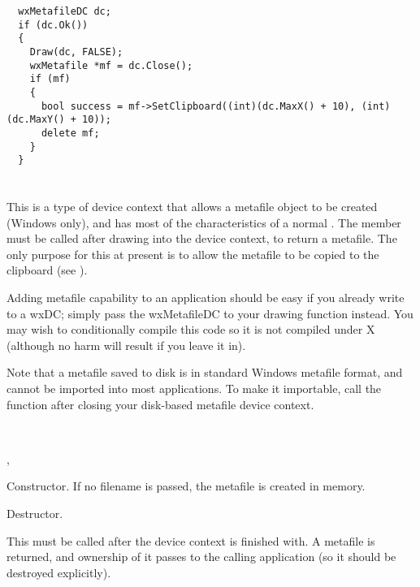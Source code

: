 \begin{verbatim}
  wxMetafileDC dc;
  if (dc.Ok())
  {
    Draw(dc, FALSE);
    wxMetafile *mf = dc.Close();
    if (mf)
    {
      bool success = mf->SetClipboard((int)(dc.MaxX() + 10), (int)(dc.MaxY() + 10));
      delete mf;
    }
  }
\end{verbatim}

\section{}\label{wxmetafiledc}

This is a type of device context that allows a metafile object to be
created (Windows only), and has most of the characteristics of a normal
. The  member must be called after drawing into the
device context, to return a metafile. The only purpose for this at
present is to allow the metafile to be copied to the clipboard (see ).

Adding metafile capability to an application should be easy if you
already write to a wxDC; simply pass the wxMetafileDC to your drawing
function instead. You may wish to conditionally compile this code so it
is not compiled under X (although no harm will result if you leave it
in).

Note that a metafile saved to disk is in standard Windows metafile format,
and cannot be imported into most applications. To make it importable,
call the function  after
closing your disk-based metafile device context.


\\


, 




Constructor. If no filename is passed, the metafile is created
in memory.



Destructor.

\label{wxmetafiledcclose}


This must be called after the device context is finished with. A
metafile is returned, and ownership of it passes to the calling
application (so it should be destroyed explicitly).

